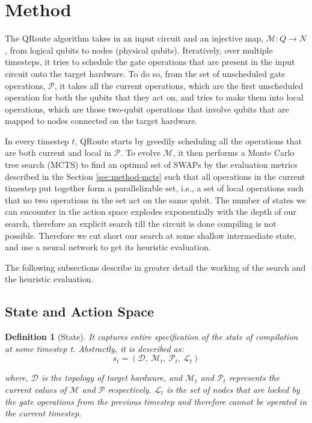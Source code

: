 \documentclass[%
 reprint,
amsmath,amssymb,showkeys,
pra,
]{revtex4-2}
\begin{document}
\newtheorem{defn}{Definition}[section]

\section{\label{sec:method}Method}

The QRoute algorithm takes in an input circuit and an injective map, $\mathcal{M}: Q \rightarrow N$, from logical qubits to nodes (physical qubits). Iteratively, over multiple timesteps, it tries to schedule the gate operations that are present in the input circuit onto the target hardware. To do so, from the set of unscheduled gate operations, $\mathcal{P}$, it takes all the current operations, which are the first unscheduled operation for both the qubits that they act on, and tries to make them into local operations, which are those two-qubit operations that involve qubits that are mapped to nodes connected on the target hardware.

In every timestep $t$, QRoute starts by greedily scheduling all the operations that are both current and local in $\mathcal{P}$. To evolve $\mathcal{M}$, it then performs a Monte Carlo tree search (MCTS) to find an optimal set of SWAPs by the evaluation metrics described in the Section \ref{sec:method-mcts} such that all operations in the current timestep put together form a parallelizable set, i.e., a set of local operations such that no two operations in the set act on the same qubit. The number of states we can encounter in the action space explodes exponentially with the depth of our search, therefore an explicit search till the circuit is done compiling is not possible. Therefore we cut short our search at some shallow intermediate state, and use a neural network to get its heuristic evaluation.


The following subsections describe in greater detail the working of the search and the heuristic evaluation.

\subsection{\label{sec:method-state} State and Action Space}

\begin{defn}[State]
    It captures entire specification of the state of compilation at some timestep t. Abstractly, it is described as:
    \begin{equation*}
        s_{t} = (\mathcal{D}, \ \mathcal{M}_{t},\ \mathcal{P}_{t},\ \mathcal{L}_{t})
    \end{equation*}

    where, $\mathcal{D}$ is the topology of target hardware, and $\mathcal{M}_t$ and $\mathcal{P}_t$ represents the current values of $\mathcal{M}$ and $\mathcal{P}$ respectively. $\mathcal{L}_{t}$ is the set of nodes that are locked by the gate operations from the previous timestep and therefore cannot be operated in the current timestep. 
\end{defn}
\end{document}
